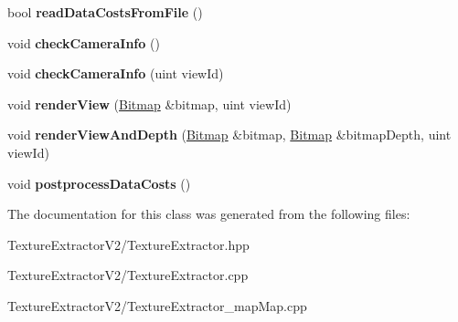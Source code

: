 \begin{DoxyCompactItemize}
\item 
\hypertarget{class_texture_extractor_a9f3605a51c466cca05f8ff216c84d574}{}bool {\bfseries read\+Data\+Costs\+From\+File} ()\label{class_texture_extractor_a9f3605a51c466cca05f8ff216c84d574}

\item 
\hypertarget{class_texture_extractor_a82baa1e8ae7c17bd9f1d44b431f82f86}{}void {\bfseries check\+Camera\+Info} ()\label{class_texture_extractor_a82baa1e8ae7c17bd9f1d44b431f82f86}

\item 
\hypertarget{class_texture_extractor_a93b91c57ec384eaf45a36c917b6c9e63}{}void {\bfseries check\+Camera\+Info} (uint view\+Id)\label{class_texture_extractor_a93b91c57ec384eaf45a36c917b6c9e63}

\item 
\hypertarget{class_texture_extractor_a77c9ce096ece162dac08599fc7c0ee47}{}void {\bfseries render\+View} (\hyperlink{class_bitmap}{Bitmap} \&bitmap, uint view\+Id)\label{class_texture_extractor_a77c9ce096ece162dac08599fc7c0ee47}

\item 
\hypertarget{class_texture_extractor_ab805f165c443e6f1616ee0be9afa74e3}{}void {\bfseries render\+View\+And\+Depth} (\hyperlink{class_bitmap}{Bitmap} \&bitmap, \hyperlink{class_bitmap}{Bitmap} \&bitmap\+Depth, uint view\+Id)\label{class_texture_extractor_ab805f165c443e6f1616ee0be9afa74e3}

\item 
\hypertarget{class_texture_extractor_a196dde057ce49bcae8cc7d07cf00f8cc}{}void {\bfseries postprocess\+Data\+Costs} ()\label{class_texture_extractor_a196dde057ce49bcae8cc7d07cf00f8cc}

\end{DoxyCompactItemize}


The documentation for this class was generated from the following files\+:\begin{DoxyCompactItemize}
\item 
Texture\+Extractor\+V2/Texture\+Extractor.\+hpp\item 
Texture\+Extractor\+V2/Texture\+Extractor.\+cpp\item 
Texture\+Extractor\+V2/Texture\+Extractor\+\_\+map\+Map.\+cpp\end{DoxyCompactItemize}

